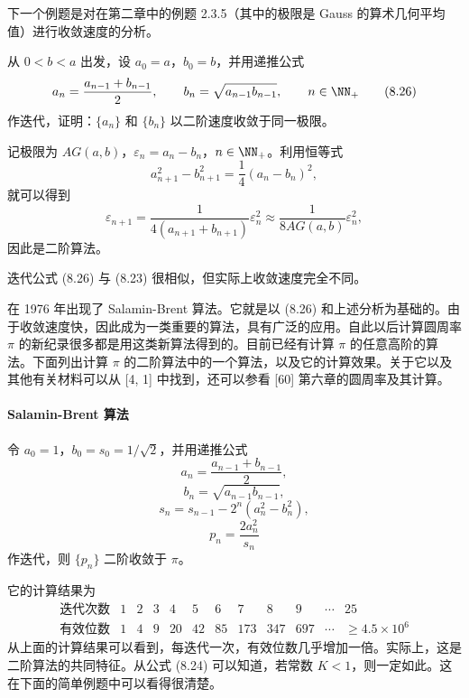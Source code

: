 下一个例题是对在第二章中的例题 2.3.5（其中的极限是 Gauss 的算术几何平均值）进行收敛速度的分析。

\begin{xexample}[8.7.2]
从 $0<b<a$ 出发，设 $a_0=a$，$b_0=b$，并用递推公式
\begin{equation}
  a_n=\frac{a_{n-1}+b_{n-1}}2,
  \qquad
  b_n=\sqrt{a_{n-1}b_{n-1}},
  \qquad n\in\NN_+
  \tag{8.26}
  \label{eq:8.26}
\end{equation}
作迭代，证明：$\{a_n\}$ 和 $\{b_n\}$ 以二阶速度收敛于同一极限。
\end{xexample}
\begin{xproof}
记极限为 $AG(a,b)$，$\varepsilon_n=a_n-b_n$，$n\in\NN_+$。利用恒等式
\[
  a_{n+1}^2-b_{n+1}^2=\frac14(a_n-b_n)^2,
\]
就可以得到
\[
  \varepsilon_{n+1}
  =\frac1{4(a_{n+1}+b_{n+1})}\varepsilon_n^2
  \approx\frac1{8AG(a,b)}\varepsilon_n^2,
\]
因此是二阶算法。
\end{xproof}

\begin{xremark}
迭代公式 (8.26) 与 (8.23) 很相似，但实际上收敛速度完全不同。
\end{xremark}

在 1976 年出现了 Salamin-Brent 算法。它就是以 (8.26) 和上述分析为基础的。由于收敛速度快，因此成为一类重要的算法，具有广泛的应用。自此以后计算圆周率 $\pi$ 的新纪录很多都是用这类新算法得到的。目前已经有计算 $\pi$ 的任意高阶的算法。下面列出计算 $\pi$ 的二阶算法中的一个算法，以及它的计算效果。关于它以及其他有关材料可以从 [4, 1] 中找到，还可以参看 [60] 第六章的圆周率及其计算。

\paragraph{Salamin-Brent 算法}
令 $a_0=1$，$b_0=s_0=1/\sqrt2$，并用递推公式
\[
  a_n=\frac{a_{n-1}+b_{n-1}}2,
\]
\[
  b_n=\sqrt{a_{n-1}b_{n-1}},
\]
\[
  s_n=s_{n-1}-2^n(a_n^2-b_n^2),
\]
\[
  p_n=\frac{2a_n^2}{s_n}
\]
作迭代，则 $\{p_n\}$ 二阶收敛于 $\pi$。

它的计算结果为
\[
\begin{array}{c|ccccccccc|c|c}
\text{迭代次数}&1&2&3&4&5&6&7&8&9&\cdots&25\\\hline
\text{有效位数}&1&4&9&20&42&85&173&347&697&\cdots&\ge4.5\times10^6
\end{array}
\]
从上面的计算结果可以看到，每迭代一次，有效位数几乎增加一倍。实际上，这是二阶算法的共同特征。从公式 (8.24) 可以知道，若常数 $K<1$，则一定如此。这在下面的简单例题中可以看得很清楚。

